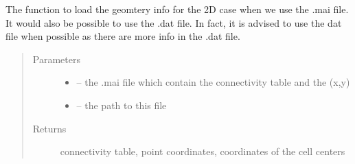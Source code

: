 \documentclass[letterpaper,10pt,english]{sphinxmanual}
\begin{document}

\begin{fulllineitems}
\label{\detokenize{index:src.rubar.load_mai_2d}}
The function to load the geomtery info for the 2D case when we use the .mai file. It would also be possible
to use the .dat file. In fact, it is advised to use the dat file when possible as there are more info in the .dat file.
\begin{quote}\begin{description}
\item[{Parameters}] \leavevmode\begin{itemize}
\item {} 
 -- the .mai file which contain the connectivity table and the (x,y)

\item {} 
 -- the path to this file

\end{itemize}

\item[{Returns}] \leavevmode
connectivity table, point coordinates, coordinates of the cell centers

\end{description}\end{quote}

\end{fulllineitems}

\end{document}
